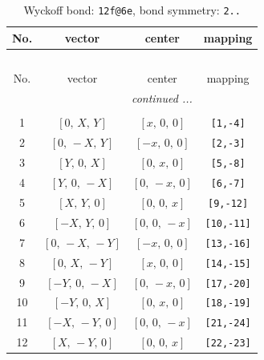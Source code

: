 \documentclass[fleqn,8pt]{jsarticle}
\begin{document}
\begin{longtable}{cccc}
\caption{Wyckoff bond: {\tt 12f@6e}, bond symmetry: {\tt 2..}}
 \\
 \hline \hline
No. & vector & center & mapping \\ \hline \endfirsthead

\multicolumn{3}{l}{\tablename\ \thetable{}} \\
 \hline \hline
No. & vector & center & mapping \\ \hline \endhead

 \hline \hline
\multicolumn{3}{r}{\footnotesize\it continued ...} \\ \endfoot

 \hline \hline
\multicolumn{3}{r}{} \\ \endlastfoot

1 & $\left[ 0,\, X,\, Y \right]$ & $\left[ x,\, 0,\, 0 \right]$ & {\tt [1,-4]} \\ \hline
2 & $\left[ 0,\, - X,\, Y \right]$ & $\left[ - x,\, 0,\, 0 \right]$ & {\tt [2,-3]} \\ \hline
3 & $\left[ Y,\, 0,\, X \right]$ & $\left[ 0,\, x,\, 0 \right]$ & {\tt [5,-8]} \\ \hline
4 & $\left[ Y,\, 0,\, - X \right]$ & $\left[ 0,\, - x,\, 0 \right]$ & {\tt [6,-7]} \\ \hline
5 & $\left[ X,\, Y,\, 0 \right]$ & $\left[ 0,\, 0,\, x \right]$ & {\tt [9,-12]} \\ \hline
6 & $\left[ - X,\, Y,\, 0 \right]$ & $\left[ 0,\, 0,\, - x \right]$ & {\tt [10,-11]} \\ \hline
7 & $\left[ 0,\, - X,\, - Y \right]$ & $\left[ - x,\, 0,\, 0 \right]$ & {\tt [13,-16]} \\ \hline
8 & $\left[ 0,\, X,\, - Y \right]$ & $\left[ x,\, 0,\, 0 \right]$ & {\tt [14,-15]} \\ \hline
9 & $\left[ - Y,\, 0,\, - X \right]$ & $\left[ 0,\, - x,\, 0 \right]$ & {\tt [17,-20]} \\ \hline
10 & $\left[ - Y,\, 0,\, X \right]$ & $\left[ 0,\, x,\, 0 \right]$ & {\tt [18,-19]} \\ \hline
11 & $\left[ - X,\, - Y,\, 0 \right]$ & $\left[ 0,\, 0,\, - x \right]$ & {\tt [21,-24]} \\ \hline
12 & $\left[ X,\, - Y,\, 0 \right]$ & $\left[ 0,\, 0,\, x \right]$ & {\tt [22,-23]} \\
\end{longtable}
\renewcommand{\arraystretch}{1.2}
\end{document}
